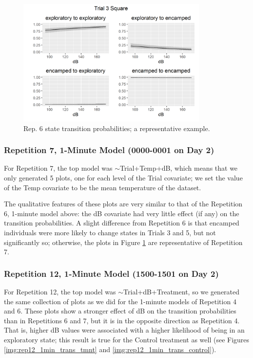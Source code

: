 \documentclass[12pt]{article}
\begin{document}
	\begin{figure}
		\centering
		\includegraphics[width=0.85\textwidth]{trans_rep_6_trial_3_Square.png}
		\caption{Rep. 6 state transition probabilities; a representative example.}
		\label{img:rep6_1min_trans_tmnt}				
	\end{figure}
	
	\subsubsection{Repetition 7, 1-Minute Model (0000-0001 on Day 2)}
	
	For Repetition 7, the top model was $\sim$Trial+Temp+dB, which means that we only generated 5 plots, one for each level of the Trial covariate; we set the value of the Temp covariate to be the mean temperature of the dataset.
	
	The qualitative features of these plots are very similar to that of the Repetition 6, 1-minute model above: the dB covariate had very little effect (if any) on the transition probabilities. A slight difference from Repetition 6 is that encamped individuals were more likely to change states in Trials 3 and 5, but not significantly so; otherwise, the plots in Figure \ref{img:rep6_1min_trans_tmnt} are representative of Repetition 7.
	
	\subsubsection{Repetition 12, 1-Minute Model (1500-1501 on Day 2)}
	
	For Repetition 12, the top model was $\sim$Trial+dB+Treatment, so we generated the same collection of plots as we did for the 1-minute models of Repetition 4 and 6. These plots show a stronger effect of dB on the transition probabilities than in Repetitions 6 and 7, but it is in the opposite direction as Repetition 4. That is, higher dB values were associated with a higher likelihood of being in an exploratory state; this result is true for the Control treatment as well (see Figures \ref{img:rep12_1min_trans_tmnt} and \ref{img:rep12_1min_trans_control}).
	
\end{document}
